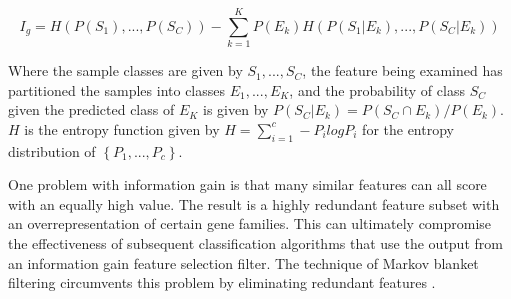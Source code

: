 {\begin{equation}\label{sam}
I_g = H \left (  P \left ( S_1  \right ), ..., P \left ( S_C  \right )  \right ) -  \sum_{ k=1 }^{ K } P  \left ( E_k  \right ) H  \left ( P \left (  S_1 | E_k \right ),..., P \left (  S_C | E_k \right )  \right )  
\end{equation}

Where the sample classes are given by $S_1,...,S_C$, the feature being examined
has partitioned the samples into classes $E_1,...,E_K$, and the probability of
class $S_C$ given the predicted class of $E_K$ is given by $P \left ( S_C | E_k
\right) = P \left ( S_C  \cap  E_k \right) / P \left ( E_k \right) $.  $H$ is
the entropy function given by $H = \sum_{ i=1 }^{ c } - P_i log P_i$ for the
entropy distribution of $\left\{ P_1,...,P_c \right\}$.

One problem with information gain is that many similar features can all score with
an equally high value.  The result is a highly redundant
feature subset with an overrepresentation of certain gene families.  This can
ultimately compromise the effectiveness of subsequent classification algorithms
that use the output from an information gain feature selection filter.  The
technique of Markov blanket filtering circumvents this problem by eliminating
redundant features \cite{koller1996tof}. 


}
